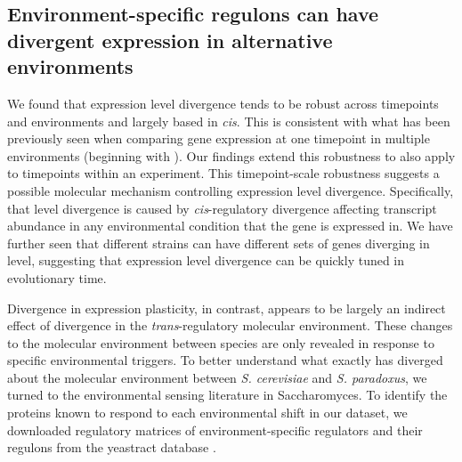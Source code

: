 \subsection{Environment-specific regulons can have divergent expression in alternative environments}

We found that expression level divergence tends to be robust across timepoints and environments and largely based in \textit{cis}. This is consistent with what has been previously seen when comparing gene expression at one timepoint in multiple environments (beginning with \cite{Tirosh2009}). Our findings extend this robustness to also apply to timepoints within an experiment. This timepoint-scale robustness suggests a possible molecular mechanism controlling expression level divergence. Specifically, that level divergence is caused by \textit{cis}-regulatory divergence affecting transcript abundance in any environmental condition that the gene is expressed in. We have further seen that different strains can have different sets of genes diverging in level, suggesting that expression level divergence can be quickly tuned in evolutionary time.

Divergence in expression plasticity, in contrast, appears to be largely an indirect effect of divergence in the \textit{trans}-regulatory molecular environment. These changes to the molecular environment between species are only revealed in response to specific environmental triggers. To better understand what exactly has diverged about the molecular environment between \textit{S. cerevisiae} and \textit{S. paradoxus}, we turned to the environmental sensing literature in Saccharomyces. To identify the proteins known to respond to each environmental shift in our dataset, we downloaded regulatory matrices of environment-specific regulators and their regulons from the yeastract database \cite{Teixeira2006, Teixeira2023}.

